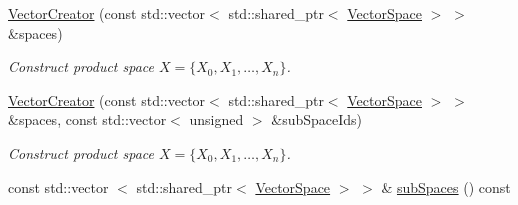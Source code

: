 \begin{DoxyCompactItemize}
\item 
\hyperlink{classSpacy_1_1ProductSpace_1_1VectorCreator_a73b6243d0ba00d019319e66bb06784dd}{\-Vector\-Creator} (const std\-::vector$<$ std\-::shared\-\_\-ptr$<$ \hyperlink{classSpacy_1_1VectorSpace}{\-Vector\-Space} $>$ $>$ \&spaces)
\begin{DoxyCompactList}\small\item\em \-Construct product space $ X = \{ X_0 , X_1 , \ldots , X_n \} $. \end{DoxyCompactList}\item 
\hyperlink{classSpacy_1_1ProductSpace_1_1VectorCreator_a82405d256a2689cb4984af1360cb3000}{\-Vector\-Creator} (const std\-::vector$<$ std\-::shared\-\_\-ptr$<$ \hyperlink{classSpacy_1_1VectorSpace}{\-Vector\-Space} $>$ $>$ \&spaces, const std\-::vector$<$ unsigned $>$ \&sub\-Space\-Ids)
\begin{DoxyCompactList}\small\item\em \-Construct product space $ X = \{ X_0 , X_1 , \ldots , X_n \} $. \end{DoxyCompactList}\item 
\hypertarget{classSpacy_1_1ProductSpace_1_1VectorCreator_aa46303313c37f29cdfe54479d85cfe87}{const std\-::vector\*
$<$ std\-::shared\-\_\-ptr$<$ \hyperlink{classSpacy_1_1VectorSpace}{\-Vector\-Space} $>$ $>$ \& \hyperlink{classSpacy_1_1ProductSpace_1_1VectorCreator_aa46303313c37f29cdfe54479d85cfe87}{sub\-Spaces} () const }\label{classSpacy_1_1ProductSpace_1_1VectorCreator_aa46303313c37f29cdfe54479d85cfe87}


\end{DoxyCompactItemize}
